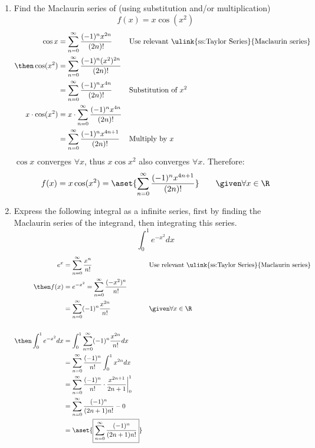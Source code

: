 \begin{enumerate}
  \item Find the Maclaurin series of (using substitution and/or multiplication)
    \[f(x) = x \cos (x^2)\]
    \begin{align*}
      \cos x &= \sum_{n=0}^{\infty} \frac{(-1)^nx^{2n} }{(2n)!}
      && \text{Use relevant \ulink{ss:Taylor Series}{Maclaurin series}} \\
      \then \cos(x^2) &= \sum_{n=0}^{\infty} \frac{(-1)^n(x^2)^{2n} }{(2n)!} \\
                      &= \sum_{n=0}^{\infty} \frac{(-1)^nx^{4n} }{(2n)!}
      && \text{Substitution of}~x^2 \\
      x \cdot \cos (x^2) &= x \cdot \sum_{n=0}^{\infty} \frac{(-1)^nx^{4n} }{(2n)!} \\
                      &= \sum_{n=0}^{\infty} \frac{(-1)^nx^{4n+1} }{(2n)!}
      && \text{Multiply by } x
    \end{align*}
    \(\cos x\) converges \(\forall x\), thus \(x \cos {x^2} \) also converges \(\forall x\).
    Therefore:
    \[%
      f(x) =  x \cos(x^2) = \aset{\sum_{n=0}^{\infty} \frac{(-1)^nx^{4n+1} }{(2n)!}}
      \qquad \given \forall x \in \R
    \]%

\newpage %

  \item Express the following integral as a infinite series, first by finding the
    Maclaurin series of the integrand, then integrating this series.
    \[%
    \int_{0}^{1} e^{-x^2}  dx
    \]%
    \begin{align*}
      e^x &= \sum_{n=0}^{\infty} \frac{x^n}{n!}
      && \text{Use relevant \ulink{ss:Taylor Series}{Maclaurin series}} \\
      \then f(x) &= e^{-x^2} =  \sum_{n=0}^{\infty} \frac{(-x^2)^n}{n!}  \\
                 &= \sum_{n=0}^{\infty} (-1)^n \frac{x^{2n}}{n!}
                 && \given \forall x \in \R\\
      \\
      \then \int_{0}^{1} e^{-x^2}  dx
       &= \int_{0}^{1} \sum_{n=0}^{\infty} (-1)^n \frac{x^{2n}}{n!} dx \\
       &= \sum_{n=0}^{\infty} \frac{(-1)^n}{n!} \int_{0}^{1} x^{2n} dx \\
       &= \sum_{n=0}^{\infty} \frac{(-1)^n}{n!} \cdot \frac{x^{2n+1}}{2n+1} \bigg|_{0}^{1} \\
       &= \sum_{n=0}^{\infty} \frac{(-1)^n}{(2n+1)n!}
       - 0 \\
       &= \aset{\boxed{\sum_{n=0}^{\infty} \frac{(-1)^n}{(2n+1)n!}}}
    \end{align*}


\end{enumerate}
